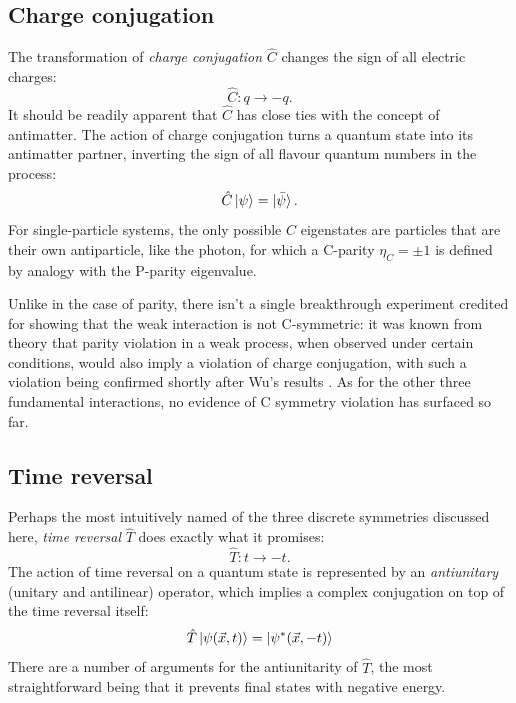 \subsection{Charge conjugation}
\label{sec:C-symmetry}
The transformation of \textit{charge conjugation} $\hat{C}$ changes the sign of all electric charges:
\begin{equation}
	\hat{C} : q \rightarrow -q.
\end{equation}
It should be readily apparent that $\hat{C}$ has close ties with the concept of antimatter.
The action of charge conjugation turns a quantum state into its antimatter partner, inverting the sign of all flavour quantum numbers in the process:
\begin{equation}
	\hat{C} \ket{\psi} = \ket{\bar{\psi}}.
\end{equation}
For single-particle systems, the only possible $\hat{C}$ eigenstates are particles that are their own antiparticle, like the photon, for which a C-parity $\eta_C = \pm 1$ is defined by analogy with the P-parity eigenvalue.

Unlike in the case of parity, there isn't a single breakthrough experiment credited for showing that the weak interaction is not C-symmetric:
it was known from theory that parity violation in a weak process, when observed under certain conditions, would also imply a violation of charge conjugation, with such a violation being confirmed shortly after Wu's results \cite{cviolation}.
As for the other three fundamental interactions, no evidence of C symmetry violation has surfaced so far.

\subsection{Time reversal}
Perhaps the most intuitively named of the three discrete symmetries discussed here, \textit{time reversal} $\hat{T}$ does exactly what it promises:
\begin{equation}
	\hat{T} : t \rightarrow -t .
\end{equation}
The action of time reversal on a quantum state is represented by an \textit{antiunitary} (unitary and antilinear) operator, which implies a complex conjugation on top of the time reversal itself:
\begin{equation}
	\hat{T} \ket{\psi(\vec{x},t)} = \ket{\psi^*(\vec{x},-t)}
\end{equation}
There are a number of arguments for the antiunitarity of $\hat{T}$, the most straightforward being that it prevents final states with negative energy.

